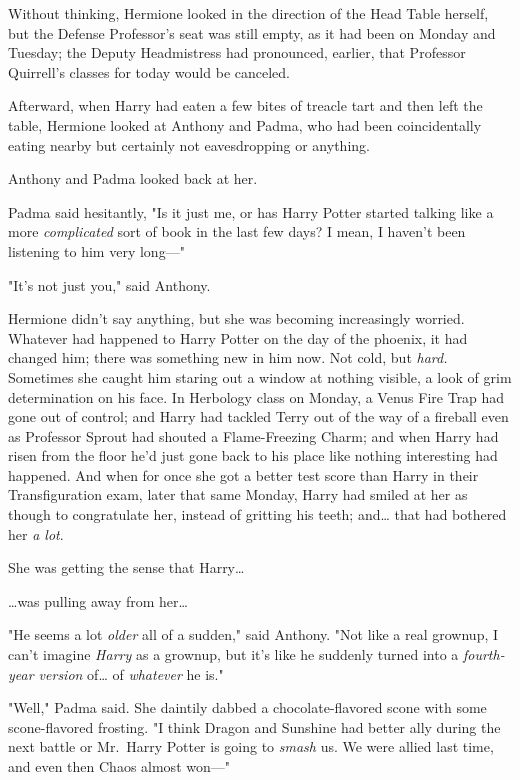 Without thinking, Hermione looked in the direction of the Head Table herself,
but the Defense Professor's seat was still empty, as it had been on Monday and
Tuesday; the Deputy Headmistress had pronounced, earlier, that Professor
Quirrell's classes for today would be canceled.

Afterward, when Harry had eaten a few bites of treacle tart and then left the
table, Hermione looked at Anthony and Padma, who had been coincidentally eating
nearby but certainly not eavesdropping or anything.

Anthony and Padma looked back at her.

Padma said hesitantly, "Is it just me, or has Harry Potter started talking like
a more \emph{complicated} sort of book in the last few days? I mean, I haven't
been listening to him very long---"

"It's not just you," said Anthony.

Hermione didn't say anything, but she was becoming increasingly worried.
Whatever had happened to Harry Potter on the day of the phoenix, it had changed
him; there was something new in him now. Not cold, but \emph{hard.} Sometimes
she caught him staring out a window at nothing visible, a look of grim
determination on his face. In Herbology class on Monday, a Venus Fire Trap had
gone out of control; and Harry had tackled Terry out of the way of a fireball
even as Professor Sprout had shouted a Flame-Freezing Charm; and when Harry had
risen from the floor he'd just gone back to his place like nothing interesting
had happened. And when for once she got a better test score than Harry in
their Transfiguration exam, later that same Monday, Harry had smiled at her as
though to congratulate her, instead of gritting his teeth; and{\ldots} that had
bothered her \emph{a lot}.

She was getting the sense that Harry{\ldots}

{\ldots}was pulling away from her{\ldots}

"He seems a lot \emph{older} all of a sudden," said Anthony. "Not like a real
grownup, I can't imagine \emph{Harry} as a grownup, but it's like he suddenly
turned into a \emph{fourth-year version} of{\ldots} of \emph{whatever} he is."

"Well," Padma said. She daintily dabbed a chocolate-flavored scone with some
scone-flavored frosting. "I think Dragon and Sunshine had better ally during
the next battle or Mr.~Harry Potter is going to \emph{smash} us. We were allied
last time, and even then Chaos almost won---"

